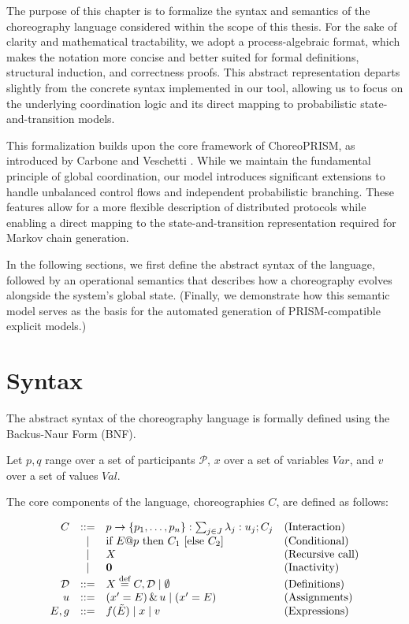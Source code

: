 The purpose of this chapter is to formalize the syntax and semantics of the choreography language considered within the scope of this thesis. For the sake of clarity and mathematical tractability, we adopt a process-algebraic format, which makes the notation more concise and better suited for formal definitions, structural induction, and correctness proofs. This abstract representation departs slightly from the concrete syntax implemented in our tool, allowing us to focus on the underlying coordination logic and its direct mapping to probabilistic state-and-transition models.

This formalization builds upon the core framework of ChoreoPRISM, as introduced by Carbone and Veschetti \cite{CarboneVeschetti}. While we maintain the fundamental principle of global coordination, our model introduces significant extensions to handle unbalanced control flows and independent probabilistic branching. These features allow for a more flexible description of distributed protocols while enabling a direct mapping to the state-and-transition representation required for Markov chain generation.

In the following sections, we first define the abstract syntax of the language, followed by an operational semantics that describes how a choreography evolves alongside the system's global state. (Finally, we demonstrate how this semantic model serves as the basis for the automated generation of PRISM-compatible explicit models.)


\section{Syntax}
\label{sec:formal_syntax}
The abstract syntax of the choreography language is formally defined using the Backus-Naur Form (BNF).

Let $p, q$ range over a set of participants $\mathcal{P}$, $x$ over a set of variables $\textit{Var}$, and $v$ over a set of values $\textit{Val}$. 

The core components of the language, choreographies $C$, are defined as follows:

\begin{equation}
	\label{eq:grammar}
\begin{array}{r c l l}
	C & ::= & p \to \{p_1, \dots, p_n\} : \sum_{j \in J} \lambda_j : u_j ; C_j & \textnormal{(Interaction)} \\
	& |   & \textnormal{if } E@p \textnormal{ then } C_1 \textnormal{ [else } C_2] & \textnormal{(Conditional)} \\
	& |   & X & \textnormal{(Recursive call)} \\
	& |   & \mathbf{0} & \textnormal{(Inactivity)} \\
	\mathcal{D} & ::= & X \stackrel{\textnormal{def}}{=} C, \mathcal{D} \mid \emptyset & \textnormal{(Definitions)} \\
	u & ::= & (x' = E) \,\&\, u \mid (x' = E) & \textnormal{(Assignments)} \\
	E, g & ::= & f(\tilde{E}) \mid x \mid v & \textnormal{(Expressions)}
	\end{array}
\end{equation}



